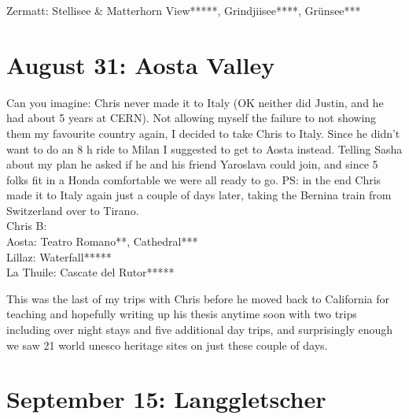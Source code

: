 Zermatt: Stellisee \& Matterhorn View*****, Grindjiisee****, Gr\"unsee***

\section{August 31: Aosta Valley}
\label{2019:Aosta}

Can you imagine: Chris never made it to Italy (OK neither did Justin, and he had about 5 years at CERN). Not allowing myself the failure to not showing them my favourite country again, I decided to take Chris to Italy. Since he didn't want to do an 8 h ride to Milan I suggested to get to Aosta instead. Telling Sasha about my plan he asked if he and his friend Yaroslava could join, and since 5 folks fit in a Honda comfortable we were all ready to go. PS: in the end Chris made it to Italy again just a couple of days later, taking the Bernina train from Switzerland over to Tirano.\\

Chris B:  \\

Aosta: Teatro Romano**, Cathedral***\\
Lillaz: Waterfall*****\\
La Thuile: Cascate del Rutor*****

This was the last of my trips with Chris before he moved back to California for teaching and hopefully writing up his thesis anytime soon with two trips including over night stays and five additional day trips, and surprisingly enough we saw 21 world unesco heritage sites on just these couple of days.\\

\section{September 15: Langgletscher}
\label{2019Langgletscher}


